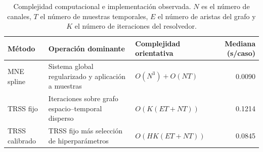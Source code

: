 \begin{table}[htbp]
\centering
\small
\setlength{\tabcolsep}{4pt}
\caption{Complejidad computacional e implementación observada. $N$ es el número de canales, $T$ el número de muestras temporales, $E$ el número de aristas del grafo y $K$ el número de iteraciones del resolvedor.}
\label{tab:ch4_runtime_complexity}
\begin{tabular}{@{}>{\raggedright\arraybackslash}p{2.5cm}>{\raggedright\arraybackslash}p{4.0cm}>{\raggedright\arraybackslash}p{3.2cm}r@{}}
\toprule
Método & Operación dominante & Complejidad orientativa & Mediana (s/caso) \\
\midrule
MNE spline & Sistema global regularizado y aplicación a muestras & $O(N^3) + O(NT)$ & 0.0090 \\
TRSS fijo & Iteraciones sobre grafo espacio--temporal disperso & $O(K(ET + NT))$ & 0.1214 \\
TRSS calibrado & TRSS fijo más selección de hiperparámetros & $O(HK(ET + NT))$ & 0.0845 \\
\bottomrule
\end{tabular}
\end{table}
